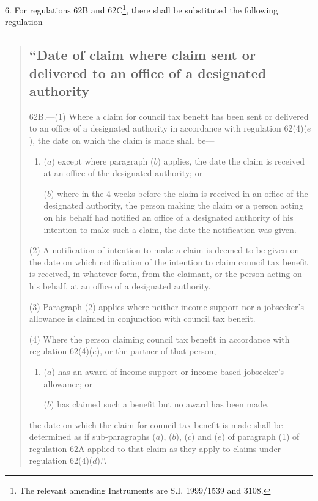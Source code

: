 \documentclass[12pt,a4paper]{article}
\begin{document}
6.  For regulations 62B and 62C\footnote{\frenchspacing The relevant amending Instruments are S.I. 1999/1539 and 3108.}, there shall be substituted the following regulation—
\begin{quotation}
\subsection*{“Date of claim where claim sent or delivered to an office of a designated authority}

62B.---(1)  Where a claim for council tax benefit has been sent or delivered to an office of a designated authority in accordance with regulation 62(4)($e$), the date on which the claim is made shall be—
\begin{enumerate}\item[]
($a$) except where paragraph ($b$)  applies, the date the claim is received at an office of the designated authority; or

($b$) where in the 4 weeks before the claim is received in an office of the designated authority, the person making the claim or a person acting on his behalf had notified an office of a \pagebreak[3] designated authority of his intention to make such a claim, the date the notification was given.
\end{enumerate}

(2) A notification of intention to make a claim is deemed to be given on the date on which notification of the intention to claim council tax benefit is received, in whatever form, from the claimant, or the person acting on his behalf, at an office of a designated authority.

(3) Paragraph (2) applies where neither income support nor a jobseeker’s allowance is claimed in conjunction with council tax benefit.

(4) Where the person claiming council tax benefit in accordance with regulation 62(4)($e$), or the partner of that person,—
\begin{enumerate}\item[]
($a$) has an award of income support or income-based jobseeker’s allowance; or

($b$) has claimed such a benefit but no award has been made,
\end{enumerate}
the date on which the claim for council tax benefit is made shall be determined as if sub-paragraphs ($a$), ($b$), ($c$)  and ($e$)  of paragraph (1) of regulation 62A applied to that claim as they apply to claims under regulation 62(4)($d$).”.
\end{quotation}
\end{document}

